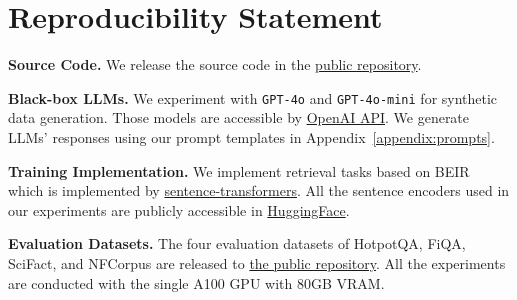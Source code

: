 \clearpage
\onecolumn
\section{Reproducibility Statement}\label{sec:reproduce}
\noindent\textbf{Source Code.} We release the source code in the \href{https://github.com/kmswin1/Syntriever}{public repository}.

\noindent\textbf{Black-box LLMs.} We experiment with \texttt{GPT-4o} and \texttt{GPT-4o-mini} for synthetic data generation. Those models are accessible by \href{https://platform.openai.com/docs/overview}{OpenAI API}. We generate LLMs' responses using our prompt templates in Appendix~\ref{appendix:prompts}.

\noindent\textbf{Training Implementation.} We implement retrieval tasks based on BEIR~\cite{thakur2021beir} which is  implemented by \href{https://sbert.net/}{sentence-transformers}. 
All the sentence encoders used in our experiments are publicly accessible in \href{https://huggingface.co/models}{HuggingFace}.

\noindent\textbf{Evaluation Datasets.} The four evaluation datasets of HotpotQA, FiQA, SciFact, and NFCorpus are released to \href{https://github.com/beir-cellar/beir}{the public repository}. 
All the experiments are conducted with the single A100 GPU with 80GB VRAM.

